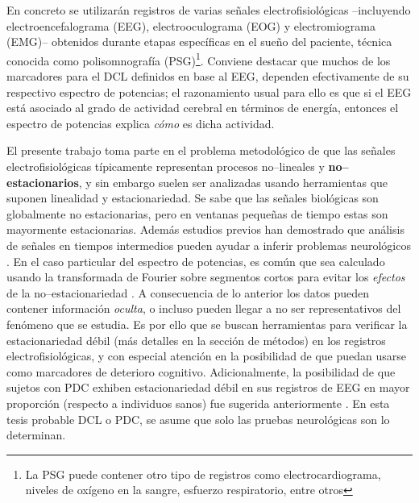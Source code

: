 En concreto se utilizarán registros de varias señales electrofisiológicas --incluyendo 
electroencefalograma (EEG), electrooculograma (EOG) y electromiograma (EMG)-- obtenidos durante 
etapas específicas en el sueño del paciente, técnica conocida como polisomnografía (PSG)\footnote{La 
PSG puede contener otro tipo de registros como electrocardiograma, niveles de oxígeno en la sangre, 
esfuerzo respiratorio, entre otros}.
%
Conviene destacar que muchos de los marcadores para el DCL definidos en base al EEG, dependen
efectivamente de su respectivo espectro de potencias; el razonamiento usual para ello es que si el 
EEG está asociado al grado de actividad cerebral en términos de energía, entonces el espectro de 
potencias explica \textit{cómo} es dicha actividad.

El presente trabajo toma parte en el problema metodológico de que las señales 
electrofisiológicas típicamente representan procesos no--lineales y \textbf{no--estacionarios}, y sin 
embargo suelen ser analizadas usando herramientas que suponen linealidad y estacionariedad. Se sabe que
las señales biológicas son globalmente no estacionarias, pero en ventanas pequeñas de tiempo estas son
mayormente estacionarias. Además estudios previos han demostrado que análisis de señales en tiempos
intermedios pueden ayudar a inferir problemas neurológicos \cite{Cohen77}.
%
En el caso particular del espectro de potencias, es común que sea calculado usando la 
transformada de Fourier sobre segmentos cortos para evitar los \textit{efectos} de la 
no--estacionariedad \cite{Kaiser00}.
%
A consecuencia de lo anterior los datos pueden contener información \textit{oculta}, o incluso 
pueden llegar a no ser representativos del fenómeno que se estudia. 
%
Es por ello que se buscan herramientas para verificar la estacionariedad débil (más detalles en 
la sección de métodos)  en los registros electrofisiológicas, y con especial atención en la 
posibilidad de que puedan usarse como marcadores de deterioro cognitivo.
%
Adicionalmente, la posibilidad de que sujetos con PDC exhiben estacionariedad débil en sus 
registros de EEG en mayor proporción (respecto a individuos sanos) fue sugerida anteriormente
\cite{Cohen77}. En esta tesis probable DCL o PDC, se asume que solo las pruebas neurológicas
son lo determinan.


